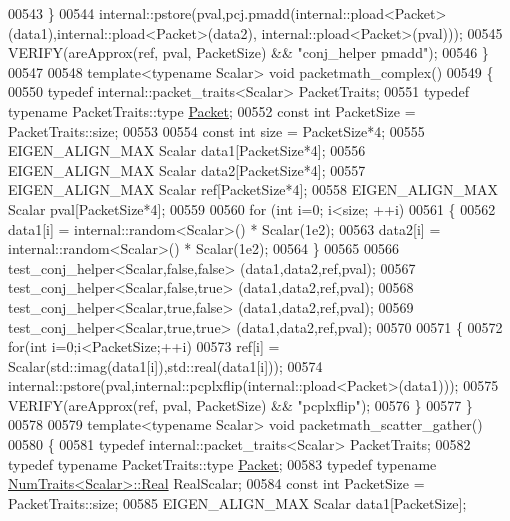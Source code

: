\begin{DoxyCode}
00543   \}
00544   internal::pstore(pval,pcj.pmadd(internal::pload<Packet>(data1),internal::pload<Packet>(data2),
      internal::pload<Packet>(pval)));
00545   VERIFY(areApprox(ref, pval, PacketSize) && \textcolor{stringliteral}{"conj\_helper pmadd"});
00546 \}
00547 
00548 \textcolor{keyword}{template}<\textcolor{keyword}{typename} Scalar> \textcolor{keywordtype}{void} packetmath\_complex()
00549 \{
00550   \textcolor{keyword}{typedef} internal::packet\_traits<Scalar> PacketTraits;
00551   \textcolor{keyword}{typedef} \textcolor{keyword}{typename} PacketTraits::type \hyperlink{group___sparse_core___module}{Packet};
00552   \textcolor{keyword}{const} \textcolor{keywordtype}{int} PacketSize = PacketTraits::size;
00553 
00554   \textcolor{keyword}{const} \textcolor{keywordtype}{int} size = PacketSize*4;
00555   EIGEN\_ALIGN\_MAX Scalar data1[PacketSize*4];
00556   EIGEN\_ALIGN\_MAX Scalar data2[PacketSize*4];
00557   EIGEN\_ALIGN\_MAX Scalar ref[PacketSize*4];
00558   EIGEN\_ALIGN\_MAX Scalar pval[PacketSize*4];
00559 
00560   \textcolor{keywordflow}{for} (\textcolor{keywordtype}{int} i=0; i<size; ++i)
00561   \{
00562     data1[i] = internal::random<Scalar>() * Scalar(1e2);
00563     data2[i] = internal::random<Scalar>() * Scalar(1e2);
00564   \}
00565 
00566   test\_conj\_helper<Scalar,false,false> (data1,data2,ref,pval);
00567   test\_conj\_helper<Scalar,false,true>  (data1,data2,ref,pval);
00568   test\_conj\_helper<Scalar,true,false>  (data1,data2,ref,pval);
00569   test\_conj\_helper<Scalar,true,true>   (data1,data2,ref,pval);
00570 
00571   \{
00572     \textcolor{keywordflow}{for}(\textcolor{keywordtype}{int} i=0;i<PacketSize;++i)
00573       ref[i] = Scalar(std::imag(data1[i]),std::real(data1[i]));
00574     internal::pstore(pval,internal::pcplxflip(internal::pload<Packet>(data1)));
00575     VERIFY(areApprox(ref, pval, PacketSize) && \textcolor{stringliteral}{"pcplxflip"});
00576   \}
00577 \}
00578 
00579 \textcolor{keyword}{template}<\textcolor{keyword}{typename} Scalar> \textcolor{keywordtype}{void} packetmath\_scatter\_gather()
00580 \{
00581   \textcolor{keyword}{typedef} internal::packet\_traits<Scalar> PacketTraits;
00582   \textcolor{keyword}{typedef} \textcolor{keyword}{typename} PacketTraits::type \hyperlink{group___sparse_core___module}{Packet};
00583   \textcolor{keyword}{typedef} \textcolor{keyword}{typename} \hyperlink{group___core___module_struct_eigen_1_1_num_traits}{NumTraits<Scalar>::Real} RealScalar;
00584   \textcolor{keyword}{const} \textcolor{keywordtype}{int} PacketSize = PacketTraits::size;
00585   EIGEN\_ALIGN\_MAX Scalar data1[PacketSize];

\end{DoxyCode}

